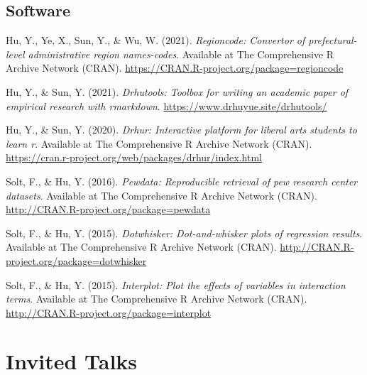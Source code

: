 \documentclass[
  12pt,
]
{article}
\newlength{\cslhangindent}
\newenvironment{CSLReferences}[2] %
 {\begin{list}{}{%
  \setlength{\itemindent}{0pt}
  \setlength{\leftmargin}{0pt}
  \setlength{\parsep}{0pt}
  \ifodd #1
   \setlength{\leftmargin}{\cslhangindent}
   \setlength{\itemindent}{-1\cslhangindent}
  \fi
  \setlength{\itemsep}{#2\baselineskip}}}
 {\end{list}}
\begin{document}
\subsection{Software}\label{software}

\label{refs-software}
\begin{CSLReferences}{1}{0}
Hu, Y., Ye, X., Sun, Y., \& Wu, W. (2021). \emph{Regioncode: Convertor
of prefectural-level administrative region names-codes}. Available at
The Comprehensive R Archive Network (CRAN).
\url{https://CRAN.R-project.org/package=regioncode}

Hu, Y., \& Sun, Y. (2021). \emph{Drhutools: Toolbox for writing an
academic paper of empirical research with rmarkdown}.
\url{https://www.drhuyue.site/drhutools/}

Hu, Y., \& Sun, Y. (2020). \emph{Drhur: Interactive platform for liberal
arts students to learn r}. Available at The Comprehensive R Archive
Network (CRAN).
\url{https://cran.r-project.org/web/packages/drhur/index.html}

Solt, F., \& Hu, Y. (2016). \emph{Pewdata: Reproducible retrieval of pew
research center datasets}. Available at The Comprehensive R Archive
Network (CRAN). \url{http://CRAN.R-project.org/package=pewdata}

Solt, F., \& Hu, Y. (2015). \emph{Dotwhisker: Dot-and-whisker plots of
regression results}. Available at The Comprehensive R Archive Network
(CRAN). \url{http://CRAN.R-project.org/package=dotwhisker}

Solt, F., \& Hu, Y. (2015). \emph{Interplot: Plot the effects of
variables in interaction terms}. Available at The Comprehensive R
Archive Network (CRAN).
\url{http://CRAN.R-project.org/package=interplot}

\end{CSLReferences}

\section{Invited Talks}\label{invited-talks}
\end{document}
